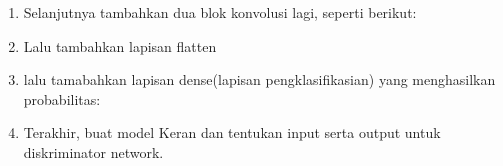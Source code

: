 \begin{enumerate}
\item Selanjutnya tambahkan dua blok konvolusi lagi, seperti berikut:


\item Lalu tambahkan lapisan flatten


\item lalu tamabahkan lapisan dense(lapisan pengklasifikasian) yang menghasilkan probabilitas:


\item Terakhir, buat model Keran dan tentukan input serta output untuk diskriminator network.


\end{enumerate}


